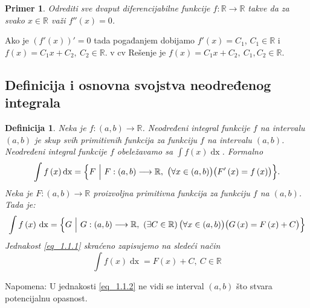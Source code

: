 \documentclass{article}
\newtheorem{definicija}{Definicija}[section]
\newtheorem{prim}{Primer}[section]
\DeclareMathOperator{\dx}{dx}
\begin{document}
\begin{primbox}
    \label{primer_1.2}
    \begin{prim}
        Odrediti sve dvaput diferencijabilne funkcije
        $f: \mathbb{R} \longrightarrow \mathbb{R}$ takve da
        za svako $x \in \mathbb{R}$ važi $f''\left(x\right) = 0$.\par
    \end{prim}
    Ako je $\left(f'\left(x\right)\right)' = 0$ tada pogađanjem dobijamo $f'\left(x\right) = C_1$, $C_1 \in \mathbb{R}$
    i     $f\left(x\right) = C_1x+C_2,\ C_2 \in \mathbb{R}$. v  cv
    Rešenje je $f\left(x\right) = C_1x + C_2,\ C_1, C_2 \in \mathbb{R}$.
\end{primbox}

\subsection{Definicija i osnovna svojstva neodređenog integrala}
\begin{defbox}
    \label{definicija_1.2}
    \begin{definicija}
        Neka je $f: \left(a, b\right) \longrightarrow \mathbb{R}$.
        Neodređeni integral funkcije $f$ na intervalu $\left(a, b\right)$ je
        skup svih primitivnih funkcija za funkciju $f$ na intervalu
        $\left(a, b\right)$. Neodređeni integral funkcije $f$ obeležavamo sa
        $\displaystyle\int f\left(x\right)\dx$. Formalno
        $$\int f\left(x\right) \dx = \Bigl\{F\ \Big|\ F: \left(a, b\right) \longrightarrow \mathbb{R},\
            \bigl(\forall x\in\left(a,b\right)\bigr)\bigl(F'\left(x\right) = f\left(x\right)\bigr)\Bigr\}.$$
        Neka je $F: \left(a,b\right) \longrightarrow \mathbb{R}$ proizvoljna
        primitivna funkcija za funkciju $f$ na $\left(a,b\right)$. Tada je:
        \setcounter{equation}{0}
        \begin{equation} \label{eq_1.1.1}
            \int f\left(x\right) \, \dx =\Bigl\{G\ \Big|\ G: \left(a, b\right) \longrightarrow \mathbb{R},\ \left(\exists C \in \mathbb{R}\right) \bigl(\forall x \in \left(a, b\right)\bigr)\bigl(G\left(x\right) = F\left(x\right) + C\bigr)\Bigr\}
        \end{equation}
        Jednakost \eqref{eq_1.1.1} skraćeno zapisujemo na sledeći način
        \begin{equation}\label{eq_1.1.2}
            \int f\left(x\right)\dx = F\left(x\right) + C,\ C\in\mathbb{R}
        \end{equation}
    \end{definicija}
    Napomena: U jednakosti \eqref{eq_1.1.2} ne vidi se interval $\left(a, b\right)$ što
    stvara potencijalnu opasnost.
\end{defbox}
\end{document}
